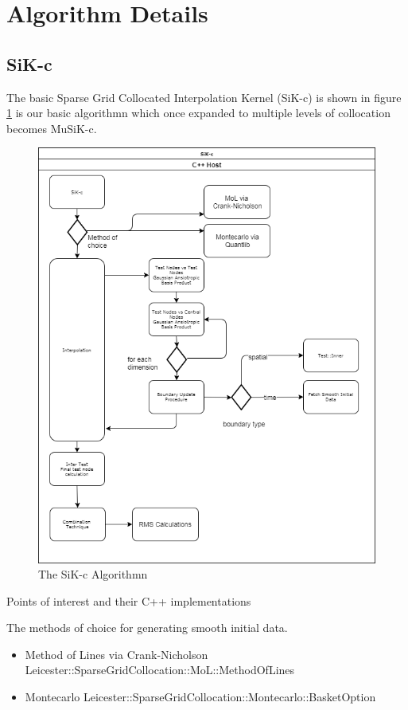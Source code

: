 \documentclass[a4paper]{amsart}
\begin{document}
\section{Algorithm Details}

\subsection{SiK-c}
The basic Sparse Grid Collocated Interpolation Kernel (SiK-c) is shown in figure \ref{fig:sikc1} is our basic algorithmn which once expanded to multiple levels of collocation becomes MuSiK-c.

\begin{figure}[h]
\centering
\includegraphics[scale=0.5]{SiKc1.png}
\caption {The SiK-c Algorithmn}
\label {fig:sikc1}
\end{figure}

Points of interest and their C++ implementations

The methods of choice for generating smooth initial data.
\begin{itemize}
\item Method of Lines via Crank-Nicholson Leicester::SparseGridCollocation::MoL::MethodOfLines
\item Montecarlo Leicester::SparseGridCollocation::Montecarlo::BasketOption
\end{itemize}
\end{document}
